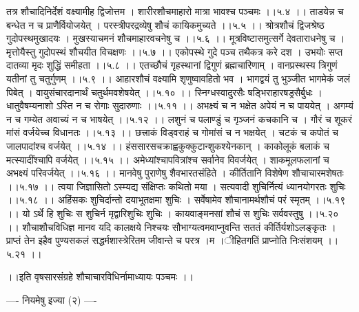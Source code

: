 \documentclass[11pt]{book}
\begin{document}
\begin{landscape}
तत्र शौचादिनिर्देशं वक्ष्यामीह द्विजोत्तम ।
शारीरशौचमाहारो मात्रा भावश्च पञ्चमः ।।५.४ ।।
ताडयेन्न च बन्धेत न च प्राणैर्वियोजयेत् ।
परस्त्रीपरद्रव्येषु शौचं कायिकमुच्यते ।।५.५ ।।
श्रोत्रशौचं द्विजश्रेष्ठ गुदोपस्थमुखादयः ।
मुखस्याचमनं शौचमाहारवचनेषु च ।।५.६ ।।
मूत्रविष्टासमुत्सर्गे देवताराधनेषु च ।
मृत्तोयैस्तु गुदोपस्थं शौचयीत विचक्षणः ।।५.७ ।।
एकोपस्थे गुदे पञ्च तथैकत्र करे दश ।
उभयोः सप्त दातव्या मृदः शुद्धिं समीहता ।।५.८ ।।
एतच्छौचं गृहस्थानां द्विगुणं ब्रह्मचारिणाम् ।
वानप्रस्थस्य त्रिगुणं यतीनां तु चतुर्गुणम् ।।५.९ ।।
आहारशौचं वक्ष्यामि शृणुष्वावहितो भव ।
भागद्वयं तु भुञ्जीत भागमेकं जलं पिबेत् ।
वायुसंचारदानार्थं चतुर्थमवशेषयेत् ।।५.१० ।।
स्निग्धस्वादुरसैः षड्भिराहारषड्रसैर्बुधः ।
धातुवैषम्यनाशो ऽस्ति न च रोगाः सुदारुणाः ।।५.११ ।।
अभक्ष्यं च न भक्षेत अपेयं न च पाययेत् ।
अगम्यं न च गम्येत अवाच्यं न च भाषयेत् ।।५.१२ ।।
लशुनं च पलाण्डुं च गृञ्जनं कचकानि च ।
गौरं च शूकरं मांसं वर्जयेच्च विधानतः ।।५.१३ ।।
छत्त्राकं विड्वराहं च गोमांसं च न भक्षयेत् ।
चटकं च कपोतं च जालपादांश्च वर्जयेत् ।।५.१४ ।।
हंससारसचक्राह्वकुक्कुटान्शुकश्येनकान् ।
काकोलूकं बलाकं च मत्स्यादींश्चापि वर्जयेत् ।।५.१५ ।।
अमेध्यांश्चापवित्रांश्च सर्वानेव विवर्जयेत् ।
शाकमूलफलानां च अभक्ष्यं परिवर्जयेत् ।।५.१६ ।।
मानवेषु पुराणेषु शैवभारतसंहिते ।
कीर्तितानि विशेषेण शौचाचारमशेषतः ।।५.१७ ।।
त्वया जिज्ञासितो ऽस्म्यद्य संक्षिप्तः कथितो मया ।
सत्यवादी शुचिर्नित्यं ध्यानयोगरतः शुचिः ।।५.१८ ।।
अहिंसकः शुचिर्दान्तो दयाभूतक्षमा शुचिः ।
सर्वेषामेव शौचानामर्थशौचं परं स्मृतम् ।।५.१९ ।।
यो ऽर्थे हि शुचिः स शुचिर्न मृद्वारिशुचिः शुचिः ।
कायवाङ्मनसां शौचं स शुचिः सर्ववस्तुषु ।।५.२० ।।
शौचाशौचविधिज्ञ मानव यदि कालक्षये निश्चयः
सौभाग्यत्वमवाप्नुवन्ति सततं कीर्तिर्यशोऽलङ्कृतः ।
प्राप्तं तेन इहैव पुण्यसकलं सद्धर्मशास्त्रेरितम
जीवान्ते च परत्र{ ।}म{ ।}ीहितगतिं प्राप्नोति निःसंशयम् ।।५.२१ ।।

 ।।इति वृषसारसंग्रहे शौचाचारविधिर्नामाध्यायः पञ्चमः ।।





---- नियमेषु इज्या (२) ----


\end{landscape}
\end{document}
